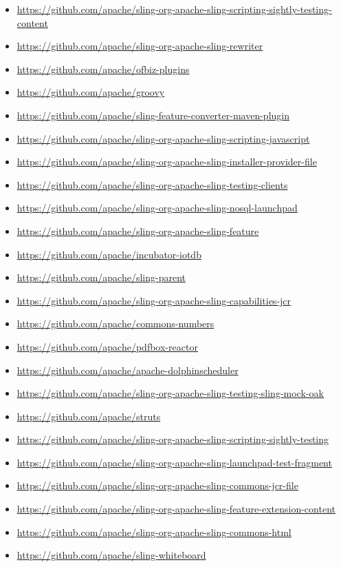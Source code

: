 \documentclass[sigconf]{acmart}
\begin{document}
\begin{itemize}
  \item \url{https://github.com/apache/sling-org-apache-sling-scripting-sightly-testing-content}
  \item \url{https://github.com/apache/sling-org-apache-sling-rewriter}
  \item \url{https://github.com/apache/ofbiz-plugins}
  \item \url{https://github.com/apache/groovy}
  \item \url{https://github.com/apache/sling-feature-converter-maven-plugin}
  \item \url{https://github.com/apache/sling-org-apache-sling-scripting-javascript}
  \item \url{https://github.com/apache/sling-org-apache-sling-installer-provider-file}
  \item \url{https://github.com/apache/sling-org-apache-sling-testing-clients}
  \item \url{https://github.com/apache/sling-org-apache-sling-nosql-launchpad}
  \item \url{https://github.com/apache/sling-org-apache-sling-feature}
  \item \url{https://github.com/apache/incubator-iotdb}
  \item \url{https://github.com/apache/sling-parent}
  \item \url{https://github.com/apache/sling-org-apache-sling-capabilities-jcr}
  \item \url{https://github.com/apache/commons-numbers}
  \item \url{https://github.com/apache/pdfbox-reactor}
  \item \url{https://github.com/apache/apache-dolphinscheduler}
  \item \url{https://github.com/apache/sling-org-apache-sling-testing-sling-mock-oak}
  \item \url{https://github.com/apache/struts}
  \item \url{https://github.com/apache/sling-org-apache-sling-scripting-sightly-testing}
  \item \url{https://github.com/apache/sling-org-apache-sling-launchpad-test-fragment}
  \item \url{https://github.com/apache/sling-org-apache-sling-commons-jcr-file}
  \item \url{https://github.com/apache/sling-org-apache-sling-feature-extension-content}
  \item \url{https://github.com/apache/sling-org-apache-sling-commons-html}
  \item \url{https://github.com/apache/sling-whiteboard}

\end{itemize}
\end{document}

